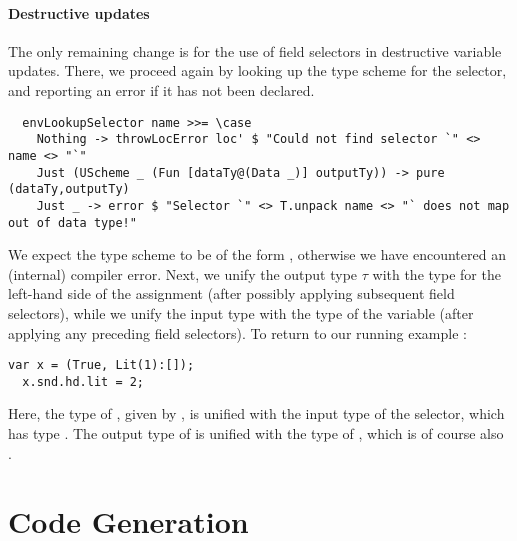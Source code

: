 \paragraph{Destructive updates}
The only remaining change is for the use of field selectors in destructive
variable updates. There, we proceed again by looking up the type scheme for the
selector, and reporting an error if it has not been declared.
\begin{verbatim}
  envLookupSelector name >>= \case
    Nothing -> throwLocError loc' $ "Could not find selector `" <> name <> "`"
    Just (UScheme _ (Fun [dataTy@(Data _)] outputTy)) -> pure (dataTy,outputTy)
    Just _ -> error $ "Selector `" <> T.unpack name <> "` does not map out of data type!"
\end{verbatim}
%
We expect the type scheme to be of the form
, otherwise we have encountered
an (internal) compiler error.
Next, we unify the output type $\tau$ with the type for the left-hand
side of the assignment (after possibly applying subsequent field selectors), while
we unify the input type with the type of the variable (after applying any
preceding field selectors).
To return to our running example :
\begin{lstlisting}[language=SPL]
  var x = (True, Lit(1):[]);
  x.snd.hd.lit = 2;
\end{lstlisting}
%
Here, the type of , given by , is unified with the input type of
the  selector, which has type .
The output type of  is unified with the type of , which is of
course also .



\section{Code Generation} \label{sec:ext-codegen}

